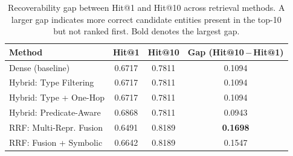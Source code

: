 \begin{table}[ht]
  \centering
  \small
  \caption{Recoverability gap between Hit@1 and Hit@10 across retrieval methods. A larger gap indicates more correct candidate entities present in the top-10 but not ranked first. Bold denotes the largest gap.}
  \label{tab:retrieval_hit_gap}
  \begin{tabular}{lccc}
    \toprule
    \textbf{Method} & \textbf{Hit@1} & \textbf{Hit@10} & \textbf{Gap (Hit@10\,$-$\,Hit@1)} \\
    \midrule
    Dense (baseline) & 0.6717 & 0.7811 & 0.1094 \\
    Hybrid: Type Filtering & 0.6717 & 0.7811 & 0.1094 \\
    Hybrid: Type + One-Hop & 0.6717 & 0.7811 & 0.1094 \\
    Hybrid: Predicate-Aware & 0.6868 & 0.7811 & 0.0943 \\
    RRF: Multi-Repr. Fusion & 0.6491 & 0.8189 & \textbf{0.1698} \\
    RRF: Fusion + Symbolic & 0.6642 & 0.8189 & 0.1547 \\
    \bottomrule
  \end{tabular}
\end{table}